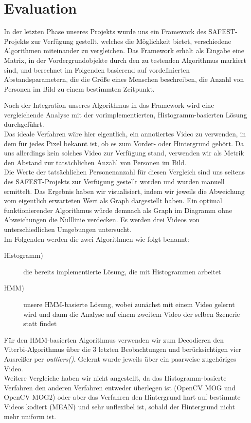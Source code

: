 \section{Evaluation}
\label{chap:evaluation}
In der letzten Phase unseres Projekts wurde uns ein Framework des SAFEST-Projekts\cite{safest} zur Verfügung gestellt, welches die Möglichkeit bietet, verschiedene Algorithmen miteinander zu vergleichen. Das Framework erhält als Eingabe eine Matrix, in der Vordergrundobjekte durch den zu testenden  Algorithmus markiert sind, und berechnet im Folgenden basierend auf vordefinierten Abstandsparametern, die die Größe eines Menschen beschreiben, die Anzahl von Personen im Bild zu einem bestimmten Zeitpunkt.

Nach der Integration unseres Algorithmus in das Framework wird eine vergleichende Analyse mit der vorimplementierten, Histogramm-basierten Lösung durchgeführt.\\
Das ideale Verfahren wäre hier eigentlich, ein annotiertes Video zu verwenden, in dem für jedes Pixel bekannt ist, ob es zum Vorder- oder Hintergrund gehört. Da uns allerdings kein solches Video zur Verfügung stand, verwenden wir als Metrik den Abstand zur tatsächlichen Anzahl von Personen im Bild.\\
Die Werte der tatsächlichen Personenanzahl für diesen Vergleich sind uns seitens des SAFEST-Projekts\cite{safest} zur Verfügung gestellt worden und wurden manuell ermittelt. Das Ergebnis haben wir visualisiert, indem wir jeweils die Abweichung vom eigentlich erwarteten Wert als Graph dargestellt haben. Ein optimal funktionierender Algorithmus würde demnach als Graph im Diagramm ohne Abweichungen die Nulllinie verdecken. Es werden drei Videos von unterschiedlichen Umgebungen untersucht.\\
Im Folgenden werden die zwei Algorithmen wie folgt benannt:
\begin{description}
	\item[Histogramm)] die bereits implementierte Lösung, die mit Histogrammen arbeitet
	\item[HMM)] unsere HMM-basierte Lösung, wobei zunächst mit einem Video gelernt wird und dann die Analyse auf einem zweitem Video der selben Szenerie statt findet
\end{description}
Für den HMM-basierten Algorithmus verwenden wir zum Decodieren den Viterbi-Algorithmus über die 3 letzten Beobachtungen und berücksichtigen vier Ausreißer per \textit{outliers()}. Gelernt wurde jeweils über ein paarweise zugehöriges Video.\\
Weitere Vergleiche haben wir nicht angestellt, da das Histogramm-basierte Verfahren den anderen Verfahren entweder überlegen ist (OpenCV MOG und OpenCV MOG2\cite{opencv}) oder aber das Verfahren den Hintergrund hart auf bestimmte Videos kodiert (MEAN) und sehr unflexibel ist, sobald der Hintergrund nicht mehr uniform ist.

